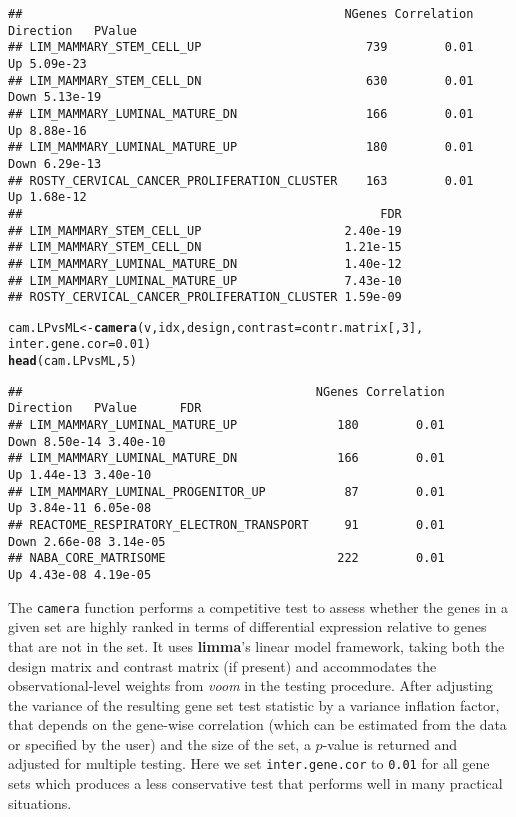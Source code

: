 \documentclass[10pt,a4paper]{extarticle}\usepackage[]{graphicx}\usepackage[]{color}
\makeatletter
\newcommand{\hlnum}[1]{\textcolor[rgb]{0.686,0.059,0.569}{#1}}%
\newcommand{\hlstd}[1]{\textcolor[rgb]{0.345,0.345,0.345}{#1}}%
\newcommand{\hlkwb}[1]{\textcolor[rgb]{0.69,0.353,0.396}{#1}}%
\newcommand{\hlkwc}[1]{\textcolor[rgb]{0.333,0.667,0.333}{#1}}%
\newcommand{\hlkwd}[1]{\textcolor[rgb]{0.737,0.353,0.396}{\textbf{#1}}}%
\newenvironment{kframe}{%
 \def\at@end@of@kframe{}%
 \ifinner\ifhmode%
  \def\at@end@of@kframe{\end{minipage}}%
  \begin{minipage}{\columnwidth}%
 \fi\fi%
 \def\FrameCommand##1{\hskip\@totalleftmargin \hskip-\fboxsep
 \colorbox{shadecolor}{##1}\hskip-\fboxsep
     \hskip-\linewidth \hskip-\@totalleftmargin \hskip\columnwidth}%
 \MakeFramed {\advance\hsize-\width
   \@totalleftmargin\z@ \linewidth\hsize
   \@setminipage}}%
 {\par\unskip\endMakeFramed%
 \at@end@of@kframe}
\newenvironment{knitrout}{}{} %
\makeatother
\begin{document}
\begin{knitrout}
\begin{kframe}
\begin{alltt}
\end{alltt}
\begin{verbatim}
##                                             NGenes Correlation Direction   PValue
## LIM_MAMMARY_STEM_CELL_UP                       739        0.01        Up 5.09e-23
## LIM_MAMMARY_STEM_CELL_DN                       630        0.01      Down 5.13e-19
## LIM_MAMMARY_LUMINAL_MATURE_DN                  166        0.01        Up 8.88e-16
## LIM_MAMMARY_LUMINAL_MATURE_UP                  180        0.01      Down 6.29e-13
## ROSTY_CERVICAL_CANCER_PROLIFERATION_CLUSTER    163        0.01        Up 1.68e-12
##                                                  FDR
## LIM_MAMMARY_STEM_CELL_UP                    2.40e-19
## LIM_MAMMARY_STEM_CELL_DN                    1.21e-15
## LIM_MAMMARY_LUMINAL_MATURE_DN               1.40e-12
## LIM_MAMMARY_LUMINAL_MATURE_UP               7.43e-10
## ROSTY_CERVICAL_CANCER_PROLIFERATION_CLUSTER 1.59e-09
\end{verbatim}
\begin{alltt}
\hlstd{cam.LPvsML} \hlkwb{<-} \hlkwd{camera}\hlstd{(v,idx,design,}\hlkwc{contrast}\hlstd{=contr.matrix[,}\hlnum{3}\hlstd{],}
                     \hlkwc{inter.gene.cor}\hlstd{=}\hlnum{0.01}\hlstd{)}
\hlkwd{head}\hlstd{(cam.LPvsML,}\hlnum{5}\hlstd{)}
\end{alltt}
\begin{verbatim}
##                                         NGenes Correlation Direction   PValue      FDR
## LIM_MAMMARY_LUMINAL_MATURE_UP              180        0.01      Down 8.50e-14 3.40e-10
## LIM_MAMMARY_LUMINAL_MATURE_DN              166        0.01        Up 1.44e-13 3.40e-10
## LIM_MAMMARY_LUMINAL_PROGENITOR_UP           87        0.01        Up 3.84e-11 6.05e-08
## REACTOME_RESPIRATORY_ELECTRON_TRANSPORT     91        0.01      Down 2.66e-08 3.14e-05
## NABA_CORE_MATRISOME                        222        0.01        Up 4.43e-08 4.19e-05
\end{verbatim}
\end{kframe}
\end{knitrout}

The \texttt{camera} function performs a competitive test to assess whether the genes in a given set are highly ranked in terms of differential expression relative to genes that are not in the set. 
It uses \textbf{limma}'s linear model framework, taking both the design matrix and contrast matrix (if present) and accommodates the observational-level weights from {\it voom} in the testing procedure.
After adjusting the variance of the resulting gene set test statistic by a variance inflation factor, that depends on the gene-wise correlation (which can be estimated from the data or specified by the user) and the size of the set, a $p$-value is returned and adjusted for multiple testing. Here we set \texttt{inter.gene.cor} to \texttt{0.01} for all gene sets which produces a less conservative test that performs well in many practical situations.\\
\end{document}
